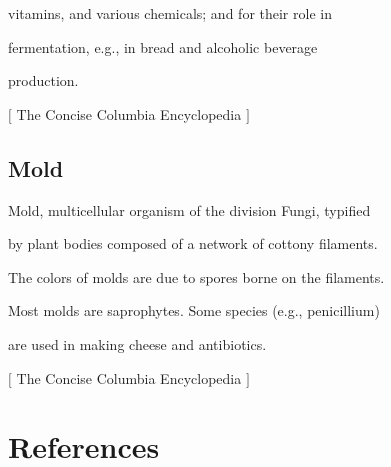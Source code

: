 vitamins, and various chemicals; and for their role in$\text{ }$\newline{}

fermentation, e.g., in bread and alcoholic beverage$\text{ }$\newline{}

production.$\text{ }$\newline{}




{$\text{[}$} The Concise Columbia Encyclopedia {$\text{]}$} 

\subsection{Mold}
\label{22}

Mold, multicellular organism of the division Fungi, typified$\text{ }$\newline{}

by plant bodies composed of a network of cottony filaments.$\text{ }$\newline{}

The colors of molds are due to spores borne on the filaments.$\text{ }$\newline{}

Most molds are saprophytes.  Some species (e.g., penicillium)$\text{ }$\newline{}

are used in making cheese and antibiotics.$\text{ }$\newline{}




{$\text{[}$} The Concise Columbia Encyclopedia {$\text{]}$} 

\section{References}
\label{23}

